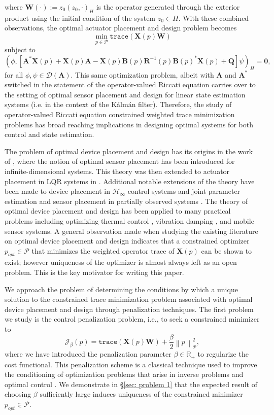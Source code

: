 \documentclass{amsart}
\newcommand{\p}[1]{\left( {#1} \right)}
\newcommand{\norm}[1]{\left\| #1 \right\|}
\newcommand{\br}[1]{\left[ #1 \right]}
\newcommand{\trace}[1]{\texttt{trace}\left( #1\right)}
\newcommand{\sP}{\mathcal{P}}
\newcommand{\bA}{\mathbf A}
\newcommand{\bX}{\mathbf X}
\newcommand{\bQ}{\mathbf Q}
\newcommand{\bW}{\mathbf W}
\begin{document}
where $\bW(\cdot) := z_0\p{z_0, \cdot}_H$ is the operator generated through the exterior product using the initial condition of the system $z_0 \in H$. With these combined observations, the optimal actuator placement and design problem becomes
$$
    \min_{p \in \sP} \trace{\bX(p) \bW}
$$
subject to
$$  
    \p{\phi,\br{\bA^*\bX(p) + \bX(p)\bA - \bX(p)\mathbf B(p) \mathbf R^{-1}(p)\mathbf B(p)^*\bX(p) + \bQ}\psi}_H = \mathbf 0,
$$
for all $\phi,\psi \in \mathcal D(\bA)$. This same optimization problem, albeit with $\bA$ and $\bA^*$ switched in the statement of the operator-valued Riccati equation carries over to the setting of optimal sensor placement and design for linear state estimation systems (i.e. in the context of the K\'alm\'an filter). Therefore, the study of operator-valued Riccati equation constrained weighted trace minimization problems has broad reaching implications in designing optimal systems for both control and state estimation. 

The problem of optimal device placement and design has its origins in the work of \cite{bensoussan2006optimization}, where the notion of optimal sensor placement has been introduced for infinite-dimensional systems. This theory was then extended to actuator placement in LQR systems in \cite{5482053}. Additional notable extensions of the theory have been made to device placement in $\mathcal H_\infty$ control systems \cite{hintermuller2017optimal} and joint parameter estimation and sensor placement in partially observed systems \cite{sharrock2022joint}. The theory of optimal device placement and design has been applied to many practical problems including optimizing thermal control \cite{hu2016sensor}, vibration damping \cite{morris2015comparison}, and mobile sensor \cite{burns2015infinite} systems. A general observation made when studying the existing literature on optimal device placement and design indicates that a constrained optimizer $p_{opt} \in \sP$ that minimizes the weighted operator trace of $\bX(p)$ can be shown to exist; however uniqueness of the optimizer is almost always left as an open problem. This is the key motivator for writing this paper. 

We approach the problem of determining the conditions by which a unique solution to the constrained trace minimization problem associated with optimal device placement and design through penalization techniques. The first problem we study is the control penalization problem, i.e., to seek a constrained minimizer to 
$$
    \mathcal J_\beta(p) = \trace{\bX(p)\bW} + \frac{\beta}{2} \norm{p}^2_\sP,
$$
where we have introduced the penalization parameter $\beta \in \mathbb R_+$ to regularize the cost functional. This penalization scheme is a classical technique used to improve the conditioning of optimization problems that arise in inverse problems \cite{kirsch2011introduction} and optimal control \cite{troltzsch2010optimal}. We demonstrate in \S\ref{sec: problem 1} that the expected result of choosing $\beta$ sufficiently large induces uniqueness of the constrained minimizer $p_{opt} \in \sP$. 
\end{document}
